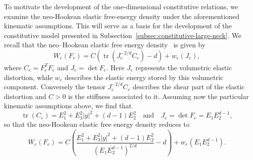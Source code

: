 \documentclass[a4paper,10pt,twoside]{amsbook}
\numberwithin{section}{chapter}
\numberwithin{equation}{chapter}
\theoremstyle{definition}
\DeclareMathOperator{\tr}{tr}
\begin{document}

To motivate the development of the one-dimensional constitutive relations, we examine the neo-Hookean elastic free-energy density under the aforementioned kinematic assumptions. This will serve as a basis for the development of the constitutive model presented in Subsection~\ref{subsec:constitutive-large-neck}. We recall that the neo--Hookean elastic free energy density~\cite{rivlin1948large} is given by
\[
W_e(F_e)=C\left(\tr(J_e^{-2/d}C_e)-d\right)+w_e(J_e),
\]
where $C_e=F_e^TF_e$ and $J_e=\det F_e$. Here $J_e$ represents the volumetric elastic distortion, while $w_e$ describes the elastic energy stored by this volumetric component. Conversely the tensor $J_e^{-2/d}C_e$ describes the shear part of the elastic distortion and $C>0$ is the stiffness associated to it. Assuming now the particular kinematic assumptions above, we find that
\[
\tr(C_e)=E_1^2+E_3^2|y|^2+(d-1)E_2^2\quad\text{and}\quad J_e=\det F_e=E_1E_2^{d-1},
\]
so that the neo-Hookean elastic free energy density reduces to
\begin{equation}
\label{eqn:necking-large:neo-hookean}
W_e(F_e)=C\left(\frac{E_1^2+E_3^2|y|^2+(d-1)E_2^2}{(E_1E_2^{d-1})^{2/d}}-d\right)+w_e(E_1E_2^{d-1}).
\end{equation}
\end{document}
